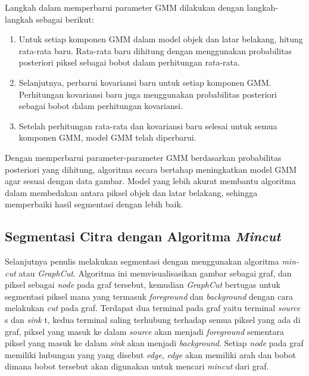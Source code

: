 Langkah dalam memperbarui parameter GMM dilakukan dengan langkah-langkah sebagai berikut:
\begin{enumerate}
    \item Untuk setiap komponen GMM dalam model objek dan latar belakang, hitung 
    rata-rata baru. Rata-rata baru dihitung dengan menggunakan probabilitas posteriori 
    piksel sebagai bobot dalam perhitungan rata-rata.
    \item Selanjutnya, perbarui kovariansi baru untuk setiap komponen GMM. Perhitungan 
    kovariansi baru juga menggunakan probabilitas posteriori sebagai bobot dalam 
    perhitungan kovariansi.
    \item Setelah perhitungan rata-rata dan kovariansi baru selesai untuk semua 
    komponen GMM, model GMM telah diperbarui.
\end{enumerate}

Dengan memperbarui parameter-parameter GMM berdasarkan probabilitas posteriori yang 
dihitung, algoritma secara bertahap meningkatkan model GMM agar sesuai dengan data gambar. 
Model yang lebih akurat membantu algoritma dalam membedakan antara piksel objek dan 
latar belakang, sehingga memperbaiki hasil segmentasi dengan lebih baik.


\subsection{Segmentasi Citra dengan Algoritma \emph{Mincut}}

Selanjutnya penulis melakukan segmentasi dengan menggunakan algoritma \emph{min-cut}
atau \emph{GraphCut}. Algoritma ini memvisualisasikan gambar sebagai graf, dan piksel 
sebagai \emph{node} pada graf tersebut, kemudian \emph{GraphCut} bertugas untuk 
segmentasi piksel mana yang termasuk \emph{foreground} dan \emph{background} dengan cara
melakukan \emph{cut} pada graf. Terdapat dua terminal pada graf yaitu terminal \emph{source} s
dan \emph{sink} t, kedua terminal saling terhubung terhadap semua piksel yang ada di graf,
piksel yang masuk ke dalam \emph{source} akan menjadi \emph{foreground} sementara piksel
yang masuk ke dalam \emph{sink} akan menjadi \emph{background}. Setiap \emph{node} 
pada graf memiliki hubungan yang yang disebut \emph{edge}, \emph{edge} akan memiliki arah 
dan bobot dimana bobot tersebut akan digunakan untuk mencari \emph{mincut} dari graf.


